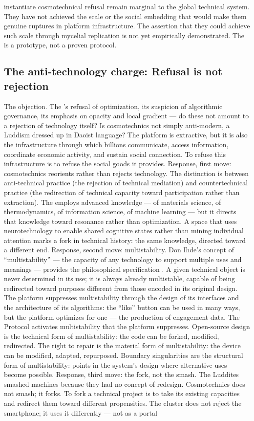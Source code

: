 instantiate cosmotechnical refusal remain marginal to the global technical system. They have not achieved the scale or the social embedding that would make them genuine ruptures in platform infrastructure. The assertion that they could achieve such scale through mycelial replication is not yet empirically demonstrated. The  is a prototype, not a proven protocol.

\subsection{The anti-technology charge: Refusal is not rejection}

The objection. The   ’s refusal of optimization, its suspicion of algorithmic governance, its emphasis on opacity and local gradient — do these not amount to a rejection of technology itself? Is cosmotechnics not simply anti-modern, a Luddism dressed up in Daoist language? The platform is extractive, but it is also the infrastructure through which billions communicate, access information, coordinate economic activity, and sustain social connection. To refuse this infrastructure is to refuse the social goods it provides. Response, first move: cosmotechnics reorients rather than rejects technology. The distinction is between anti-technical practice (the rejection of technical mediation) and countertechnical practice (the redirection of technical capacity toward participation rather than extraction). The  employs advanced knowledge — of materials science, of thermodynamics, of information science, of machine learning — but it directs that knowledge toward resonance rather than optimization. A space that uses neurotechnology to enable shared cognitive states rather than mining individual attention marks a fork in technical history: the same knowledge, directed toward a different end. Response, second move: multistability. Don Ihde’s concept of “multistability” — the capacity of any technology to support multiple uses and meanings — provides the philosophical specification \cite{ihde_1990}. A given technical object is never determined in its use; it is always already multistable, capable of being redirected toward purposes different from those encoded in its original design. The platform suppresses multistability through the design of its interfaces and the architecture of its algorithms: the “like” button can be used in many ways, but the platform optimizes for one — the production of engagement data. The  Protocol activates multistability that the platform suppresses. Open-source design is the technical form of multistability: the code can be forked, modified, redirected. The right to repair is the material form of multistability: the device can be modified, adapted, repurposed. Boundary singularities are the structural form of multistability: points in the system’s design where alternative uses become possible. Response, third move: the fork, not the smash. The Luddites smashed machines because they had no concept of redesign. Cosmotechnics does not smash; it forks. To fork a technical project is to take its existing capacities and redirect them toward different propensities. The  cluster does not reject the smartphone; it uses it differently — not as a portal 